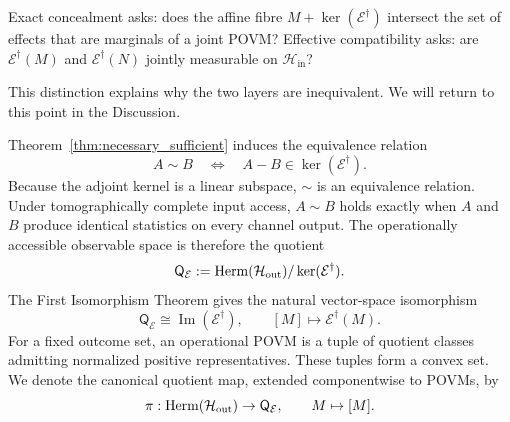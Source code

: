 \documentclass[
aps,pra,twocolumn,10pt,
superscriptaddress,longbibliography,floatfix
]{revtex4-2}
\DeclareMathOperator{\Herm}{Herm}
\DeclareMathOperator{\im}{Im}
\begin{document}
Exact concealment asks: does the affine fibre $M + \ker(\mathcal E^\dagger)$ intersect the set of effects that are marginals of a joint POVM? Effective compatibility asks: are $\mathcal E^\dagger(M)$ and $\mathcal E^\dagger(N)$ jointly measurable on $\mathcal H_{\mathrm{in}}$?

This distinction explains why the two layers are inequivalent. We will return to this point in the Discussion.

Theorem~\ref{thm:necessary_sufficient} induces the equivalence relation
\[
A\sim B
\quad\Longleftrightarrow\quad
A-B\in\ker(\mathcal E^\dagger).
\]
Because the adjoint kernel is a linear subspace, $\sim$ is an equivalence relation. Under tomographically complete input access, $A\sim B$ holds exactly when $A$ and $B$ produce identical statistics on every channel output. The operationally accessible observable space is therefore the quotient
\[
\mathsf Q_{\mathcal E}
:=
\Herm(\mathcal H_{\rm out})/\ker(\mathcal E^\dagger).
\]
The First Isomorphism Theorem gives the natural vector-space isomorphism
\begin{equation}
\mathsf Q_{\mathcal E}
\cong
\im(\mathcal E^\dagger),
\qquad
[M]\longmapsto\mathcal E^\dagger(M).
\label{eq:isomorphism}
\end{equation}
For a fixed outcome set, an operational POVM is a tuple of quotient classes admitting normalized positive representatives. These tuples form a convex set. We denote the canonical quotient map, extended componentwise to POVMs, by
\[
\pi:\Herm(\mathcal H_{\rm out})\to\mathsf Q_{\mathcal E},
\qquad M\mapsto[M].
\]
\end{document}
